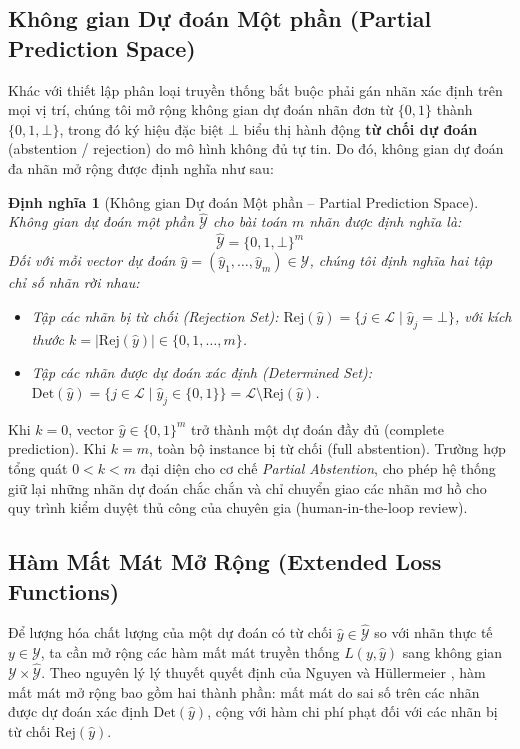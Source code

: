 \documentclass[11pt,a4paper]{article}
\newtheorem{definition}{Định nghĩa}[section]
\begin{document}
\subsection{Không gian Dự đoán Một phần (Partial Prediction Space)}
Khác với thiết lập phân loại truyền thống bắt buộc phải gán nhãn xác định trên mọi vị trí, chúng tôi mở rộng không gian dự đoán nhãn đơn từ $\{0, 1\}$ thành $\{0, 1, \bot\}$, trong đó ký hiệu đặc biệt $\bot$ biểu thị hành động \textbf{từ chối dự đoán} (abstention / rejection) do mô hình không đủ tự tin. Do đó, không gian dự đoán đa nhãn mở rộng được định nghĩa như sau:

\begin{definition}[Không gian Dự đoán Một phần -- Partial Prediction Space]
Không gian dự đoán một phần $\hat{\mathcal{Y}}$ cho bài toán $m$ nhãn được định nghĩa là:
\begin{equation}
\hat{\mathcal{Y}} = \{0, 1, \bot\}^m
\end{equation}
Đối với mỗi vector dự đoán $\hat{y} = (\hat{y}_1, \dots, \hat{y}_m) \in \hat{\mathcal{Y}}$, chúng tôi định nghĩa hai tập chỉ số nhãn rời nhau:
\begin{itemize}
    \item Tập các nhãn bị từ chối (Rejection Set): $\mathrm{Rej}(\hat{y}) = \{j \in \mathcal{L} \mid \hat{y}_j = \bot\}$, với kích thước $k = |\mathrm{Rej}(\hat{y})| \in \{0, 1, \dots, m\}$.
    \item Tập các nhãn được dự đoán xác định (Determined Set): $\mathrm{Det}(\hat{y}) = \{j \in \mathcal{L} \mid \hat{y}_j \in \{0, 1\}\} = \mathcal{L} \setminus \mathrm{Rej}(\hat{y})$.
\end{itemize}
\end{definition}

Khi $k = 0$, vector $\hat{y} \in \{0, 1\}^m$ trở thành một dự đoán đầy đủ (complete prediction). Khi $k = m$, toàn bộ instance bị từ chối (full abstention). Trường hợp tổng quát $0 < k < m$ đại diện cho cơ chế \textit{Partial Abstention}, cho phép hệ thống giữ lại những nhãn dự đoán chắc chắn và chỉ chuyển giao các nhãn mơ hồ cho quy trình kiểm duyệt thủ công của chuyên gia (human-in-the-loop review).

\subsection{Hàm Mất Mát Mở Rộng (Extended Loss Functions)}
Để lượng hóa chất lượng của một dự đoán có từ chối $\hat{y} \in \hat{\mathcal{Y}}$ so với nhãn thực tế $y \in \mathcal{Y}$, ta cần mở rộng các hàm mất mát truyền thống $L(y, \hat{y})$ sang không gian $\mathcal{Y} \times \hat{\mathcal{Y}}$. Theo nguyên lý lý thuyết quyết định của Nguyen và H\"ullermeier \cite{nguyen2021multilabel}, hàm mất mát mở rộng bao gồm hai thành phần: mất mát do sai số trên các nhãn được dự đoán xác định $\mathrm{Det}(\hat{y})$, cộng với hàm chi phí phạt đối với các nhãn bị từ chối $\mathrm{Rej}(\hat{y})$.
\end{document}
